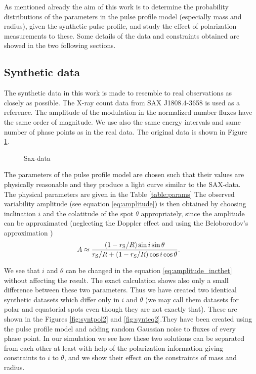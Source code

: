 \documentclass{wihuri}
\def\rg{r_{\rm S}} %
\def\be{\begin{equation}}
\def\ee{\end{equation}}
\def\rg{r_{\rm S}} %
\begin{document}
As mentioned already the aim of this work is to determine the probability distributions of the parameters in the pulse profile model (especially mass and radius), given the synthetic pulse profile, and study the effect of polarization measurements to these. Some details of the data and constraints obtained are showed in the two following sections. 


\subsection{Synthetic data}

The synthetic data in this work is made to resemble to real observations as closely as possible. The X-ray count data from SAX J1808.4-3658 is used as a reference. The amplitude of the modulation in the normalized number fluxes have the same order of magnitude. We use also the same energy intervals and same number of phase points as in the real data. The original data is shown in Figure \ref{fig:saxdata}.  

\begin{figure}
\centerline{} 
\caption{Sax-data
\label{fig:saxdata}}
\end{figure}


The parameters of the pulse profile model are chosen such that their values are physically reasonable and they produce a light curve similar to the SAX-data. The physical parameters are given in the Table \ref{table:params} The observed variability amplitude (see equation \ref{eq:amplitude}) is then obtained by choosing inclination $i$ and the colatitude of the spot $\theta$ appropriately, since the amplitude can be approximated (neglecting the Doppler effect and using the Beloborodov's approximation \cite{poutaviironen})
\be \label{eq:amplitude_incthet}
A \approx \frac{(1-\rg/R)\sin i \sin \theta}{\rg/R+(1-\rg/R)\cos i \cos \theta}.
\ee 

We see that $i$ and $\theta$ can be changed in the equation \ref{eq:amplitude_incthet} without affecting the result. The exact calculation shows also only a small difference between these two parameters. Thus we have created two identical synthetic datasets which differ only in $i$ and $\theta$ (we may call them datasets for polar and equatorial spots even though they are not exactly that). These are shown in the Figures \ref{fig:syntpol2} and \ref{fig:synteq2}.They have been created using the pulse profile model and adding random Gaussian noise to fluxes of every phase point. In our simulation we see how these two solutions can be separated from each other at least with help of the polarization information giving constraints to $i$ to $\theta$, and we show their effect on the constraints of mass and radius. 
\end{document}
